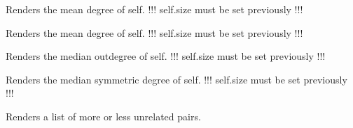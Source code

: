 \documentclass[letterpaper,10pt,english]{sphinxmanual}
\begin{document}
\begin{fulllineitems}

\begin{fulllineitems}
\label{techDoc:digraphs.Digraph.computeMeanOutDegree}
Renders the mean degree of self.
!!! self.size must be set previously !!!

\end{fulllineitems}


\begin{fulllineitems}
\label{techDoc:digraphs.Digraph.computeMeanSymDegree}
Renders the mean degree of self.
!!! self.size must be set previously !!!

\end{fulllineitems}


\begin{fulllineitems}
\label{techDoc:digraphs.Digraph.computeMedianOutDegree}
Renders the median outdegree of self.
!!! self.size must be set previously !!!

\end{fulllineitems}


\begin{fulllineitems}
\label{techDoc:digraphs.Digraph.computeMedianSymDegree}
Renders the median symmetric degree of self.
!!! self.size must be set previously !!!

\end{fulllineitems}


\begin{fulllineitems}
\label{techDoc:digraphs.Digraph.computeMoreOrLessUnrelatedPairs}
Renders a list of more or less unrelated pairs.

\end{fulllineitems}



\end{fulllineitems}
\end{document}
